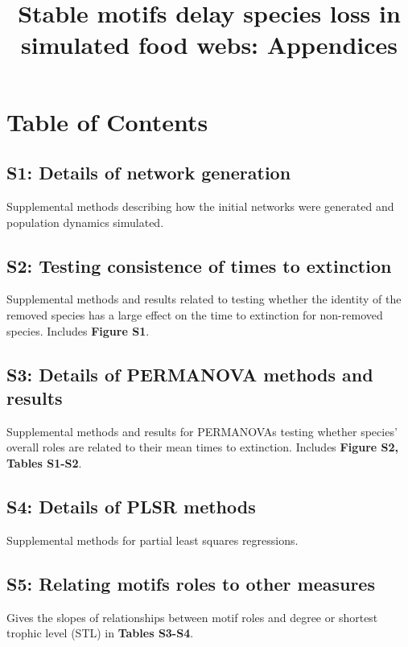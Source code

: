 \documentclass[12pt]{article}
\title{Stable motifs delay species loss in simulated food webs: Appendices}
\date{}
\author{}
\begin{document}
 
\maketitle 
\raggedright
\setlength{\parindent}{15pt} 

\section*{Table of Contents}

    \subsection*{S1: Details of network generation}

        Supplemental methods describing how the initial networks were generated and population dynamics simulated.

    \subsection*{S2: Testing consistence of times to extinction}
    
        Supplemental methods and results related to testing whether the identity of the removed species has a large effect on the time to extinction for non-removed species. Includes \textbf{Figure S1}.
    
    \subsection*{S3: Details of PERMANOVA methods and results}
        
        Supplemental methods and results for PERMANOVAs testing whether species' overall roles are related to their mean times to extinction. Includes \textbf{Figure S2, Tables S1-S2}.

    \subsection*{S4: Details of PLSR methods}

        Supplemental methods for partial least squares regressions. 
    
    \subsection*{S5: Relating motifs roles to other measures}
        
        Gives the slopes of relationships between motif roles and degree or shortest trophic level (STL) in \textbf{Tables S3-S4}.
        
\end{document}
